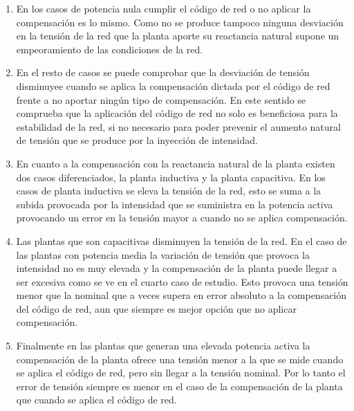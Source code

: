 \documentclass{book}
\begin{document}
\begin{enumerate}[1.]

\item En los casos de potencia nula cumplir el c\'odigo de red o no aplicar la compensaci\'on es lo mismo. Como no se produce tampoco ninguna desviaci\'on en la tensi\'on de la red que la planta aporte su reactancia natural supone un empeoramiento de las condiciones de la red. \par

 \item En el resto de casos se puede comprobar que la desviaci\'on de tensi\'on disminuyee cuando se aplica la compensaci\'on dictada por el c\'odigo de red frente a no aportar ning\'un tipo de compensaci\'on. En este sentido se comprueba que la aplicaci\'on del c\'odigo de red no solo es beneficiosa para la estabilidad de la red, si no necesario para poder prevenir el aumento natural de tensi\'on que se produce por la inyecci\'on de intensidad. \par

\item En cuanto a la compensaci\'on con la reactancia natural de la planta existen dos casos diferenciados, la planta inductiva y la planta capacitiva. En los casos de planta inductiva se eleva la tensi\'on de la red, esto se suma a la subida provocada por la intensidad que se suministra en la potencia activa provocando un error en la tensi\'on mayor a cuando no se aplica compensaci\'on. \par

\item Las plantas que son capacitivas disminuyen la tensi\'on de la red. En el caso de las plantas con potencia media la variaci\'on de tensi\'on que provoca la intensidad no es muy elevada y la compensaci\'on de la planta puede llegar a ser excesiva como se ve en el cuarto caso de estudio. Esto provoca una tensi\'on menor que la nominal que a veces supera en error absoluto a la compensaci\'on del c\'odigo de red, aun que siempre es mejor opci\'on que no aplicar compensaci\'on. \par

\item Finalmente en las plantas que generan una elevada potencia activa la compensaci\'on de la planta ofrece una tensi\'on menor a la que se mide cuando se aplica el c\'odigo de red, pero sin llegar a la tensi\'on nominal. Por lo tanto el error de tensi\'on siempre es menor en el caso de la compensaci\'on de la planta que cuando se aplica el c\'odigo de red. \par


\end{enumerate}
\end{document}
